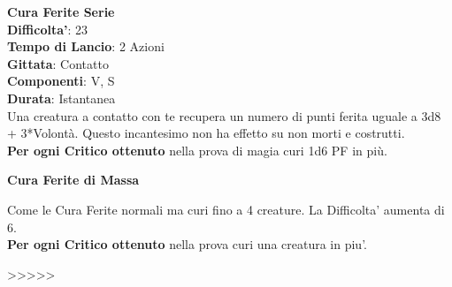 \begin{multicols}{2}
\medskip\textbf{Cura Ferite Serie}\\
\textbf{Difficolta'}: 23 \\
\textbf{Tempo di Lancio}: 2 Azioni\\
\textbf{Gittata}: Contatto\\
\textbf{Componenti}: V, S\\
\textbf{Durata}: Istantanea\\
Una creatura a contatto con te recupera un numero di punti ferita uguale a 3d8 + 3*Volontà. Questo incantesimo non ha effetto su non morti e costrutti.\\
\textbf{Per ogni Critico ottenuto} nella prova di magia curi 1d6 PF in più.

\medskip\textbf{Cura Ferite di Massa}

Come le Cura Ferite normali ma curi fino a 4 creature.
La Difficolta' aumenta di 6.\\
\textbf{Per ogni Critico ottenuto} nella prova curi una creatura in piu'.

>>>>>


\end{multicols}
